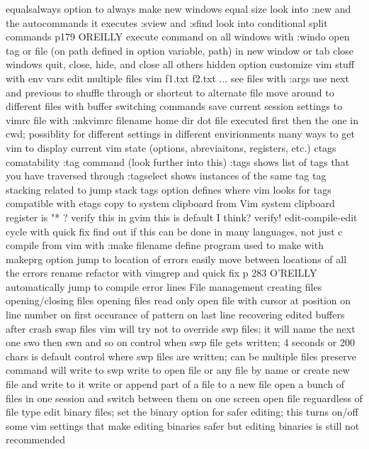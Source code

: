 \documentclass[12pt]{book}
\begin{document}
{      equalsalways option to always make new windows equal size
      look into :new and the autocommands it executes
      :sview and :sfind
      look into conditional split commands p179 OREILLY
      execute command on all windows with :windo
      open tag or file (on path defined in option variable, path) in new window or tab
      close windows
        quit, close, hide, and close all others
          hidden option
    customize vim stuff with env vars
    edit multiple files
      vim f1.txt f2.txt ...
      see files with :args
      use next and previous to shuffle through or shortcut to alternate file
    move around to different files with buffer switching commands
    save current session settings to vimrc file with :mkvimrc filename
  home dir dot file executed first then the one in cwd; possiblity for different settings in different envirionments
  many ways to get vim to display current vim state (options, abreviaitons, registers, etc.)
  ctags comatability
    :tag command (look further into this)
    :tags shows list of tags that you have traversed through
    :tagselect shows instances of the same tag
    tag stacking
      related to jump stack
    tags option defines where vim looks for tags
    compatible with etags
  copy to system clipboard from Vim
    system clipboard register is "* ?  verify this
    in gvim this is default I think? verify!
  edit-compile-edit cycle with quick fix
    find out if this can be done in many languages, not just c
    compile from vim with :make filename
    define program used to make with makeprg option
    jump to location of errors
    easily move between locations of all the errors
  rename refactor with vimgrep and quick fix
    p 283 O'REILLY
  automatically jump to compile error lines
  File management
    creating files
    opening/closing files
    opening files read only
    open file with cursor at position
      on line number
      on first occurance of pattern
      on last line
    recovering edited buffers after crash
      swap files
      vim will try not to override swp files; it will name the next one swo then swn and so on
      control when swp file gets written; 4 seconds or 200 chars is default
      control where swp files are written; can be multiple files
      preserve command will write to swp
    write to open file or any file by name or create new file and write to it
    write or append part of a file to a new file
    open a bunch of files in one session and switch between them on one screen
    open file reguardless of file type
      edit binary files; set the binary option for safer editing; this turns on/off some vim settings that make editing binaries safer but editing binaries is still not recommended
}
\end{document}
